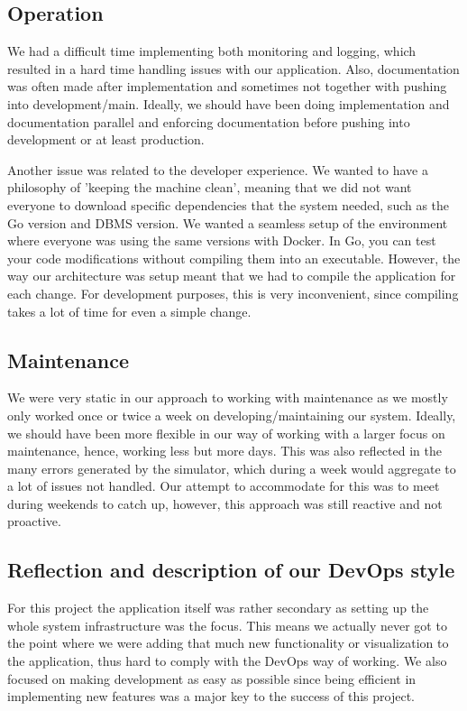 \subsection{Operation}
We had a difficult time implementing both monitoring and logging, which resulted in a hard time handling issues with our application. Also, documentation was often made after implementation and sometimes not together with pushing into development/main. Ideally, we should have been doing implementation and documentation parallel and enforcing documentation before pushing into development or at least production. 

Another issue was related to the developer experience. We wanted to have a philosophy of 'keeping the machine clean', meaning that we did not want everyone to download specific dependencies that the system needed, such as the Go version and DBMS version. We wanted a seamless setup of the environment where everyone was using the same versions with Docker. In Go, you can test your code modifications without compiling them into an executable. However, the way our architecture was setup meant that we had to compile the application for each change. For development purposes, this is very inconvenient, since compiling takes a lot of time for even a simple change. 

\subsection{Maintenance}
We were very static in our approach to working with maintenance as we mostly only worked once or twice a week on developing/maintaining our system. Ideally, we should have been more flexible in our way of working with a larger focus on maintenance, hence, working less but more days. This was also reflected in the many errors generated by the simulator, which during a week would aggregate to a lot of issues not handled. Our attempt to accommodate for this was to meet during weekends to catch up, however, this approach was still reactive and not proactive. 

\subsection{Reflection and description of our DevOps style}
For this project the application itself was rather secondary as setting up the whole system infrastructure was the focus. This means we actually never got to the point where we were adding that much new functionality or visualization to the application, thus hard to comply with the DevOps way of working. We also focused on making development as easy as possible since being efficient in implementing new features was a major key to the success of this project.
